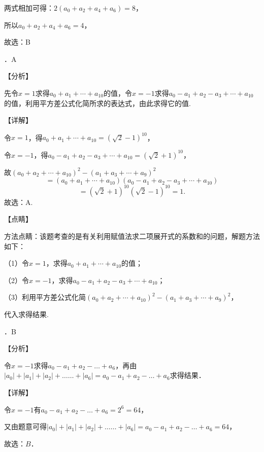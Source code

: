 \noindent 两式相加可得：$2(a_{0} +a_{2} +a_{4} +a_{6} )=8$，

\noindent 所以$a_{0} +a_{2} +a_{4} +a_{6} =4$，

\noindent 故选：B

．A

\noindent 【分析】

\noindent 先令$x=1$求得$a_{0} +a_{1} +\cdots +a_{10} $的值，令$x=-1$求得$a_{0} -a_{1} +a_{2} -a_{3} +\cdots +a_{10} $的值，利用平方差公式化简所求的表达式，由此求得它的值.

\noindent 【详解】

\noindent 令$x=1$，得$a_{0} +a_{1} +\cdots +a_{10} =\left(\sqrt{2} -1\right)^{10} $，

\noindent 令$x=-1$，得$a_{0} -a_{1} +a_{2} -a_{3} +\cdots +a_{10} =\left(\sqrt{2} +1\right)^{10} $，

\noindent 故$\left(a_{0} +a_{2} +\cdots +a_{10} \right)^{2} -\left(a_{1} +a_{3} +\cdots +a_{9} \right)^{2} $
\[=\left(a_{0} +a_{1} +\cdots +a_{10} \right)\left(a_{0} -a_{1} +a_{2} -a_{3} +\cdots +a_{10} \right)\] 
\[=\left(\sqrt{2} +1\right)^{10} \left(\sqrt{2} -1\right)^{10} =1.\] 
故选：A.

\noindent 【点睛】

\noindent 方法点睛：该题考查的是有关利用赋值法求二项展开式的系数和的问题，解题方法如下：

\noindent （1）令$x=1$，求得$a_{0} +a_{1} +\cdots +a_{10} $的值；

\noindent （2）令$x=-1$，求得$a_{0} -a_{1} +a_{2} -a_{3} +\cdots +a_{10} $；

\noindent （3）利用平方差公式化简$\left(a_{0} +a_{2} +\cdots +a_{10} \right)^{2} -\left(a_{1} +a_{3} +\cdots +a_{9} \right)^{2} $，

\noindent 代入求得结果.

．B

\noindent 【分析】

\noindent 令$x=-1$求得$a_{0} -a_{1} +a_{2} -\ldots +a_{6} $，再由$|a_{0} |+|a_{1} |+|a_{2} |+\ldots \ldots +|a_{6} |=a_{0} -a_{1} +a_{2} -\ldots +a_{6} $求得结果．

\noindent 【详解】

\noindent 令$x=-1$有$a_{0} -a_{1} +a_{2} -\ldots +a_{6} =2^{6} =64$，

\noindent 又由题意可得$|a_{0} |+|a_{1} |+|a_{2} |+\ldots \ldots +|a_{6} |=a_{0} -a_{1} +a_{2} -\ldots +a_{6} =64$，

\noindent 故选：$B$．

